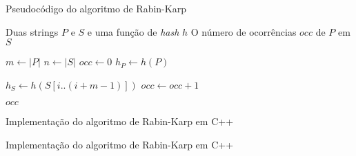 \begin{frame}[fragile]{Pseudocódigo do algoritmo de Rabin-Karp}

    \begin{algorithm}[H]
        \caption{Algoritmo de Rabin-Karp -- Naive}
        \begin{algorithmic}[1]
            \Require Duas strings $P$ e $S$ e uma função de \textit{hash} $h$
            \Ensure O número de ocorrências $occ$ de $P$ em $S$

                \State $m \gets |P|$
                \State $n \gets |S|$
                \State $occ \gets 0$
                \State $h_P \gets h(P)$

                    \State $h_S \gets h(S[i..(i + m - 1)])$
                            \State $occ \gets occ + 1$
                        \EndIf
                    \EndIf
                \EndFor

                \State \Return $occ$
            \EndFunction
        \end{algorithmic}
    \end{algorithm}

\end{frame}


\begin{frame}[fragile]{Implementação do algoritmo de Rabin-Karp em C++}
\end{frame}

\begin{frame}[fragile]{Implementação do algoritmo de Rabin-Karp em C++}
\end{frame}
